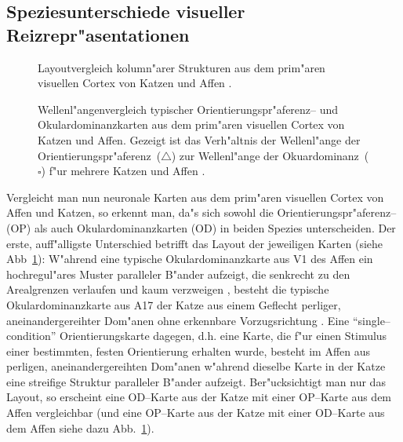 \subsection{Speziesunterschiede visueller Reizrepr"asentationen}
\label{unterschiede}

\begin{figure}[p]
\begin{center}
\end{center}
\caption{Layoutvergleich kolumn"arer Strukturen aus dem prim"aren visuellen
Cortex von Katzen \protect{} und Affen
\protect{}.}
\label{layout}
\end{figure}

\begin{figure}[p]
\begin{center}
\end{center}
\caption{Wellenl"angenvergleich typischer Orientierungspr"aferenz-- und
Okulardominanzkarten aus dem prim"aren visuellen Cortex von Katzen und
Affen. Gezeigt ist das Verh"altnis der Wellenl"ange der
Orientierungspr"aferenz~($\triangle$) zur Wellenl"ange der
Okuardominanz~($\square$) f"ur mehrere Katzen
\protect{} und Affen
\protect{}.}
\label{wavelength}
\end{figure}

Vergleicht man nun neuronale Karten aus dem prim"aren visuellen Cortex von
Affen und Katzen, so erkennt man, da"s sich sowohl die
Orientierungspr"aferenz-- (OP) als auch Okulardominanzkarten (OD) in beiden
Spezies unterscheiden. Der erste, auff"alligste Unterschied betrifft das
Layout der jeweiligen Karten (siehe Abb~\ref{layout}): W"ahrend eine
typische Okulardominanzkarte aus V1 des Affen ein hochregul"ares Muster
paralleler B"ander aufzeigt, die senkrecht zu den Arealgrenzen verlaufen
und kaum verzweigen \cite{levayetal:1985,grinvald:1991}, besteht die
typische Okulardominanzkarte aus A17 der Katze aus einem Geflecht perliger,
aneinandergereihter Dom"anen ohne erkennbare Vorzugsrichtung
\cite{andersonetal:1988,loewel:1987}.  Eine ``single--condition''
Orientierungskarte dagegen, d.h. eine Karte, die f"ur einen Stimulus einer
bestimmten, festen Orientierung erhalten wurde, besteht im Affen aus
perligen, aneinandergereihten Dom"anen w"ahrend dieselbe Karte in der Katze
eine streifige Struktur paralleler B"ander aufzeigt.  Ber"ucksichtigt man
nur das Layout, so erscheint eine OD--Karte aus der Katze mit einer
OP--Karte aus dem Affen vergleichbar (und eine OP--Karte aus der Katze mit
einer OD--Karte aus dem Affen siehe dazu Abb.~\ref{layout}).

